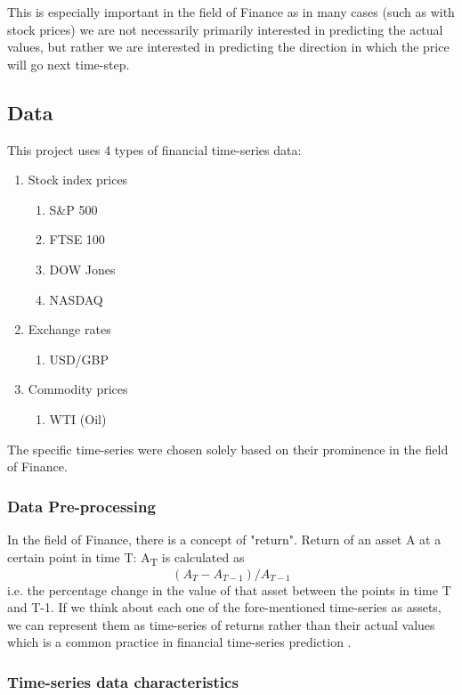 This is especially important in the field of Finance as in many cases (such as with stock prices) we are not necessarily primarily interested in predicting the actual values, but rather we are interested in predicting the direction in which the price will go next time-step.

\subsection{Data}

This project uses 4 types of financial time-series data:
\begin{enumerate}
  \item Stock index prices
  \begin{enumerate}
      \item S\&P 500
      \item FTSE 100
      \item DOW Jones
      \item NASDAQ
  \end{enumerate}
  \item Exchange rates
  \begin{enumerate}
      \item USD/GBP
  \end{enumerate}
  \item Commodity prices
  \begin{enumerate}
      \item WTI (Oil)
  \end{enumerate}
\end{enumerate}

The specific time-series were chosen solely based on their prominence in the field of Finance.

\subsubsection{Data Pre-processing}

In the field of Finance, there is a concept of "return". Return of an asset A at a certain point in time T: A\textsubscript{T} is calculated as \[(A_T-A_{T-1})/A_{T-1}\] i.e. the percentage change in the value of that asset between the points in time T and T-1. If we think about each one of the fore-mentioned time-series as assets, we can represent them as time-series of returns rather than their actual values which is a common practice in financial time-series prediction \cite{hu2021survey}.


\subsubsection{Time-series data characteristics}




